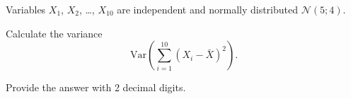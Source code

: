 
\begin{question}
Variables \(X_1\), \(X_2\), \ldots, \(X_{10}\) are independent and normally distributed \(\mathcal{N}(5; 4)\).

Calculate the variance
\[
\mathrm{Var}\left(\sum_{i=1}^{10}(X_i - \bar X)^2\right).
\]

Provide the answer with 2 decimal digits.
\end{question}


